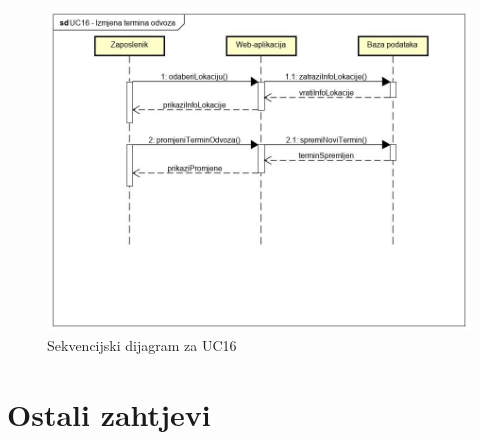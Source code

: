 			\begin{figure}[H]
				\centering
				\includegraphics[width=1\linewidth]{dijagrami/uc16seq}
				\caption{Sekvencijski dijagram za UC16}
				\label{fig:uc16seq}
			\end{figure}
			
			\newpage
			
					
		\section{Ostali zahtjevi}
		
